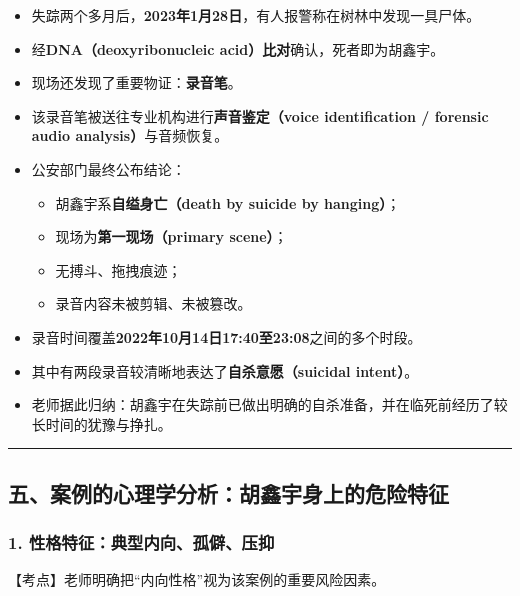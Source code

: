 \documentclass[
  chinese,
  9pt,
  a4paper,
]{ctexart}
\providecommand{\tightlist}{%
  \setlength{\itemsep}{0pt}\setlength{\parskip}{0pt}}
\begin{document}
\begin{itemize}
\item
  失踪两个多月后，\textbf{2023年1月28日}，有人报警称在树林中发现一具尸体。
\item
  经\textbf{DNA（deoxyribonucleic acid）比对}确认，死者即为胡鑫宇。
\item
  现场还发现了重要物证：\textbf{录音笔}。
\item
  该录音笔被送往专业机构进行\textbf{声音鉴定（voice identification /
  forensic audio analysis）}与音频恢复。
\item
  公安部门最终公布结论：

  \begin{itemize}
  \tightlist
  \item
    胡鑫宇系\textbf{自缢身亡（death by suicide by hanging）}；
  \item
    现场为\textbf{第一现场（primary scene）}；
  \item
    无搏斗、拖拽痕迹；
  \item
    录音内容未被剪辑、未被篡改。
  \end{itemize}
\item
  录音时间覆盖\textbf{2022年10月14日17:40至23:08}之间的多个时段。
\item
  其中有两段录音较清晰地表达了\textbf{自杀意愿（suicidal intent）}。
\item
  老师据此归纳：胡鑫宇在失踪前已做出明确的自杀准备，并在临死前经历了较长时间的犹豫与挣扎。
\end{itemize}

\begin{center}\rule{0.5\linewidth}{0.5pt}\end{center}

\subsection{五、案例的心理学分析：胡鑫宇身上的危险特征}\label{ux4e94ux6848ux4f8bux7684ux5fc3ux7406ux5b66ux5206ux6790ux80e1ux946bux5b87ux8eabux4e0aux7684ux5371ux9669ux7279ux5f81}

\subsubsection{1.
性格特征：典型内向、孤僻、压抑}\label{ux6027ux683cux7279ux5f81ux5178ux578bux5185ux5411ux5b64ux50fbux538bux6291}

【考点】老师明确把``内向性格''视为该案例的重要风险因素。
\end{document}
